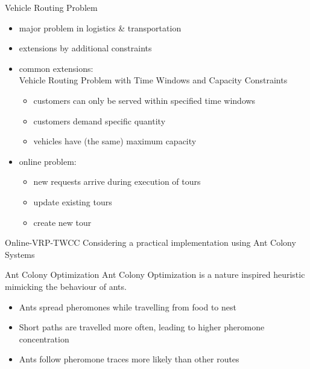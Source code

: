 \documentclass{beamer}
\begin{document}
\begin{frame}{Vehicle Routing Problem}

  \begin{itemize}
    \item major problem in logistics \& transportation
    \item extensions by additional constraints
    \item<2-> common extensions: \\Vehicle Routing Problem \alert{with Time Windows and Capacity Constraints}
      \begin{itemize}
        \item customers can only be served within specified time windows
	\item customers demand specific quantity
	\item vehicles have (the same) maximum capacity
      \end{itemize}
    \item<3> online problem: 
      \begin{itemize}
        \item new requests arrive during execution of tours
	\item update existing tours
	\item create new tour
      \end{itemize}
  \end{itemize}
   
\end{frame}

\begin{frame}{Online-VRP-TWCC}
  Considering a practical implementation using Ant Colony Systems

  \begin{block}{Ant Colony Optimization}
    \alert{Ant Colony Optimization} is a nature inspired heuristic mimicking the behaviour of ants.
  \end{block}
  \begin{itemize}
    \item Ants spread pheromones while travelling from food to nest
    \item Short paths are travelled more often, leading to higher pheromone concentration
    \item Ants follow pheromone traces more likely than other routes
  \end{itemize}

\end{frame}
\end{document}
